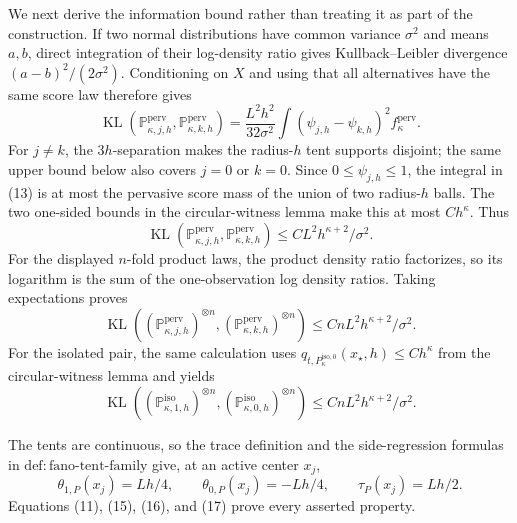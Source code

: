 We next derive the information bound rather than treating it as part of
the construction.  If two normal distributions have common variance
\(\sigma^2\) and means \(a,b\), direct integration of their log-density
ratio gives Kullback--Leibler divergence \((a-b)^2/(2\sigma^2)\).
Conditioning on \(X\) and using that all alternatives have the same score
law therefore gives
\[
 \operatorname{KL}(\mathbb P_{\kappa,j,h}^{\mathrm{perv}},
                    \mathbb P_{\kappa,k,h}^{\mathrm{perv}})
 =\frac{L^2h^2}{32\sigma^2}
   \int(\psi_{j,h}-\psi_{k,h})^2 f_{\kappa}^{\mathrm{perv}}.
 \tag{13}
\]
For \(j\ne k\), the \(3h\)-separation makes the radius-\(h\) tent
supports disjoint; the same upper bound below also covers \(j=0\) or
\(k=0\).  Since \(0\le\psi_{j,h}\le1\), the integral in (13) is at most
the pervasive score mass of the union of two radius-\(h\) balls.  The
two one-sided bounds in the circular-witness lemma make this at most
\(C h^{\kappa}\).  Thus
\[
 \operatorname{KL}(\mathbb P_{\kappa,j,h}^{\mathrm{perv}},
                    \mathbb P_{\kappa,k,h}^{\mathrm{perv}})
 \le C L^2h^{\kappa+2}/\sigma^2.
 \tag{14}
\]
For the displayed \(n\)-fold product laws, the product density ratio
factorizes, so its logarithm is the sum of the one-observation log density
ratios.  Taking expectations proves
\[
 \operatorname{KL}((\mathbb P_{\kappa,j,h}^{\mathrm{perv}})^{\otimes n},
                    (\mathbb P_{\kappa,k,h}^{\mathrm{perv}})^{\otimes n})
 \le CnL^2h^{\kappa+2}/\sigma^2.
 \tag{15}
\]
For the isolated pair, the same calculation uses
\(q_{t,P_{\kappa}^{\mathrm{iso},0}}(x_{\star},h)\le Ch^{\kappa}\)
from the circular-witness lemma and yields
\[
 \operatorname{KL}((\mathbb P_{\kappa,1,h}^{\mathrm{iso}})^{\otimes n},
                    (\mathbb P_{\kappa,0,h}^{\mathrm{iso}})^{\otimes n})
 \le CnL^2h^{\kappa+2}/\sigma^2.
 \tag{16}
\]

The tents are continuous, so the trace definition and the side-regression
formulas in \(\mathrm{def:fano\text{-}tent\text{-}family}\) give, at an
active center \(x_j\),
\[
 \theta_{1,P}(x_j)=Lh/4,
 \qquad \theta_{0,P}(x_j)=-Lh/4,
 \qquad \tau_P(x_j)=Lh/2.
 \tag{17}
\]
Equations (11), (15), (16), and (17) prove every asserted property.